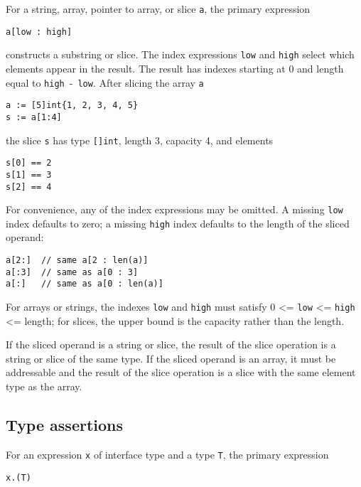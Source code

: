 For a string, array, pointer to array, or slice \texttt{a}, the primary
expression

\begin{Verbatim}[frame=single]
a[low : high]
\end{Verbatim}

constructs a substring or slice. The index expressions \texttt{low} and
\texttt{high} select which elements appear in the result. The result has
indexes starting at 0 and length equal to \texttt{high}~-~\texttt{low}.
After slicing the array \texttt{a}

\begin{Verbatim}[frame=single]
a := [5]int{1, 2, 3, 4, 5}
s := a[1:4]
\end{Verbatim}

the slice \texttt{s} has type \texttt{{[}{]}int}, length 3, capacity 4,
and elements

\begin{Verbatim}[frame=single]
s[0] == 2
s[1] == 3
s[2] == 4
\end{Verbatim}

For convenience, any of the index expressions may be omitted. A missing
\texttt{low} index defaults to zero; a missing \texttt{high} index
defaults to the length of the sliced operand:

\begin{Verbatim}[frame=single]
a[2:]  // same a[2 : len(a)]
a[:3]  // same as a[0 : 3]
a[:]   // same as a[0 : len(a)]
\end{Verbatim}

For arrays or strings, the indexes \texttt{low} and \texttt{high} must
satisfy 0 \textless{}= \texttt{low} \textless{}= \texttt{high}
\textless{}= length; for slices, the upper bound is the capacity rather
than the length.

If the sliced operand is a string or slice, the result of the slice
operation is a string or slice of the same type. If the sliced operand
is an array, it must be addressable and
the result of the slice operation is a slice with the same element type
as the array.

\subsection*{Type assertions}

For an expression \texttt{x} of interface type and a type \texttt{T},
the primary expression

\begin{Verbatim}[frame=single]
x.(T)
\end{Verbatim}

